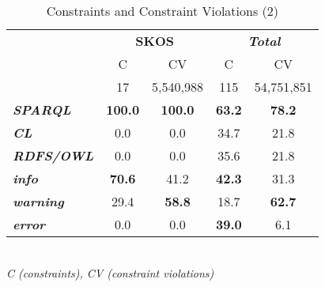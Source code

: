 \documentclass[conference]{IEEEtran}
\newcommand{\tb}[1]{\todo[size=\small, color=green!40]{\textbf{Thomas:} #1}}
\begin{document}
\begin{table}[H]
		\scriptsize
    \begin{center}
		\caption{Constraints and Constraint Violations (2)}
		\label{tab:evaluation-constraint-violations-2}
    \begin{tabular}{@{}lcc|cc@{}}
    \multirow{2}{*}{} &
      \multicolumn{2}{c}{\textbf{SKOS}} &
      \multicolumn{2}{c}{\textbf{\emph{Total}}} \\
    \textbf{} & C & CV & C & CV \\
    \hline
		 & 17 & 5,540,988 & 115 & 54,751,851 \\
		\hline
		\textbf{\emph{SPARQL}} & \textbf{100.0} & \textbf{100.0} & \textbf{63.2} & \textbf{78.2} \\
		\textbf{\emph{CL}} & 0.0 & 0.0 & 34.7 & 21.8 \\
		\textbf{\emph{RDFS/OWL}} & 0.0 & 0.0 & 35.6 & 21.8 \\
		\hline
		\textbf{\emph{info}} & \textbf{70.6} & 41.2 & \textbf{42.3} & 31.3 \\
		\textbf{\emph{warning}} & 29.4 & \textbf{58.8} & 18.7 & \textbf{62.7} \\
		\textbf{\emph{error}} & 0.0 & 0.0 & \textbf{39.0} & 6.1\\
    \bottomrule
    \end{tabular}
    \\ \emph{C (constraints), CV (constraint violations)}
    \end{center}
\end{table}

\end{document}
